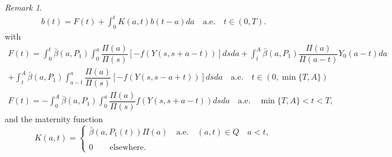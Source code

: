 \documentclass[10pt, a4paper]{amsart}
\theoremstyle{plain}
\theoremstyle{definition}
\theoremstyle{remark}
\newtheorem{remark}[lemma]{Remark}
\numberwithin{equation}{section}
\begin{document}
\begin{remark}
  \begin{align}\label{eq2.41}
b(t)=F(t)+\displaystyle\int_0^tK(a,t)b(t-a)da\quad\text{a.e.}\quad t\in (0,T).
\end{align}
with
\begin{align}\label{eq2.42}
F(t)=\displaystyle\int_0^t\bar{\beta}(a,P_1)\int_{0}^a\dfrac{\Pi(a)}{\Pi(s)} [-f(Y(s,s+a-t))]dsda+\displaystyle\int_t^A\bar{\beta}(a,P_1)\dfrac{\Pi(a)}{\Pi(a-t)}Y_0(a-t)da
\end{align}
\begin{align*}
+\displaystyle\int_t^A\bar{\beta}(a,P_1)\int_{a-t}^a\dfrac{\Pi(a)}{\Pi(s)} [-f(Y(s,s-a+t))]dsda \quad\text{a.e.}\quad t\in(0,\min{\lbrace T,A\rbrace})
\end{align*}
\begin{align}
    F(t)=-\displaystyle\int_0^A\bar{\beta}(a,P_1)\int_0^a\dfrac{\Pi(a)}{\Pi(s)}f(Y(s,s+a-t))dsda\quad\text{a.e.}\quad \min{\lbrace T,A\rbrace}<t<T,
\end{align}
and  the maternity function
\begin{equation}
K(a,t)=\left\lbrace 
\begin{array}{ll}
\bar{\beta}(a,P_1(t))\Pi(a)\quad\text{a.e.}\quad (a,t)\in Q\quad a<t,\\
\\0 \qquad\text{elsewhere}. 
\end{array}

\end{equation}
\end{remark}
\end{document}
